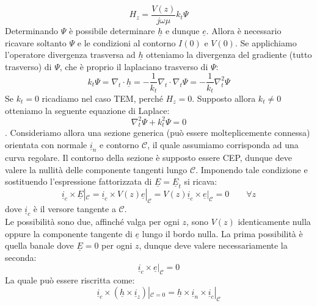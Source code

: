 \documentclass{book}
\begin{document}
    \begin{equation}
        H_{z} = \frac{V(z)}{j \omega \mu} k_{t}\Psi
    \end{equation}
    Determinando $\Psi$ è possibile determinare $\underline{h}$ e dunque $\underline{e}$. Allora è necessario 
    ricavare soltanto $\Psi$ e le condizioni al contorno $I(0)$ e $V(0)$. Se applichiamo l'operatore divergenza trasversa ad $\underline{h}$
    otteniamo la divergenza del gradiente (tutto trasverso) di $\Psi$, che è proprio il laplaciano trasverso di $\Psi$:
    \begin{equation}
        k_{t}\Psi = \nabla_{t} \cdot \underline{h} = -\frac{1}{k_{t}}\nabla_{t} \cdot \nabla_{t}\Psi = -\frac{1}{k_{t}}\nabla ^{2} _{t} \Psi
    \end{equation}
    Se $k_{t}=0$ ricadiamo nel caso TEM, perché $H_{z} = 0$. Supposto allora $k_{t} \neq 0$ otteniamo la seguente equazione di Laplace:
    \begin{equation}
        \nabla _{t} ^{2} \Psi+k_{t} ^{2}\Psi = 0
    \end{equation}. \newpage 
    Consideriamo allora una sezione generica (può essere molteplicemente connessa) orientata con normale $\underline{i}_{n}$ e contorno $\mathcal{C}$, il quale assumiamo 
    corrisponda ad una curva regolare. Il contorno della sezione è supposto essere CEP, dunque deve valere la nullità delle componente tangenti lungo $\mathcal{C}$.
    Imponendo tale condizione e sostituendo l'espressione fattorizzata di $\underline{E}=\underline{E}_{t}$ si ricava:
    \begin{equation}
        \underline{i}_{c} \times \underline{E}|_{\mathcal{C}} =  \underline{i}_{c} \times V(z)\underline{e} |_{\mathcal{C}} = V(z)\underline{i}_{c} \times \underline{e}|_{\mathcal{C}}= 0 \qquad \forall z
    \end{equation}
    dove $\underline{i}_{c}$ è il versore tangente a $\mathcal{C}$.\\
    Le possibilità sono due, affinché valga per ogni $z$, sono $V(z)$ identicamente nulla oppure la componente tangente di $\underline{e}$ lungo il bordo nulla. La prima
    possibilità è quella banale dove $\underline{E} = 0$ per ogni $z$, dunque deve valere necessariamente la seconda:
    \begin{equation}
        \underline{i}_{c} \times \underline{e}|_{\mathcal{C}} = 0
    \end{equation}
    La quale può essere riscritta come:
    \begin{equation}
        \underline{i}_{c} \times (\underline{h} \times \underline{i}_{z})|_{\mathcal{C}= 0} = \underline{h} \times \underline{i}_{n} \times \underline{i}_{c}|_{\mathcal{C}}
    \end{equation}
\end{document}
